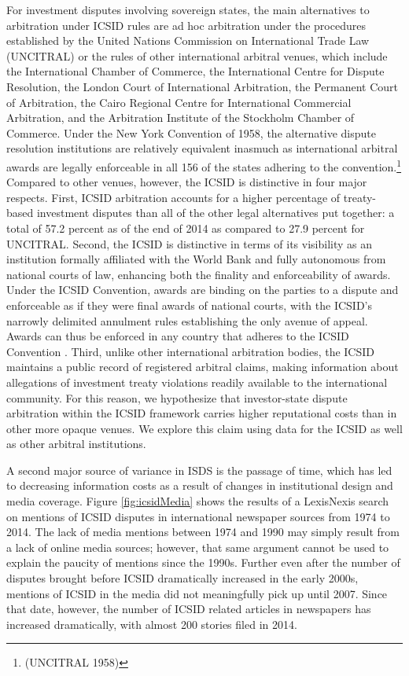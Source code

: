 \documentclass[12pt,onesided]{amsart}
\begin{document}
For investment disputes involving sovereign states, the main alternatives to arbitration under ICSID rules are ad hoc arbitration under the procedures established by the United Nations Commission on International Trade Law (UNCITRAL) or the rules of other international arbitral venues, which include the International Chamber of Commerce, the International Centre for Dispute Resolution, the London Court of International Arbitration, the Permanent Court of Arbitration, the Cairo Regional Centre for International Commercial Arbitration, and the Arbitration Institute of the Stockholm Chamber of Commerce. Under the New York Convention of 1958,  the alternative dispute resolution institutions are relatively equivalent inasmuch as international arbitral awards are legally enforceable in all 156 of the states adhering to the convention.\footnote{(UNCITRAL 1958)} Compared to other venues, however, the ICSID is distinctive in four major respects. First,  ICSID arbitration accounts for a higher percentage of treaty-based investment disputes than all of the other legal alternatives put together: a total of 57.2 percent as of the end of 2014 as compared to 27.9 percent for UNCITRAL. Second, the ICSID is distinctive in terms of its visibility as an institution formally affiliated with the World Bank and fully autonomous from national courts of law, enhancing both the finality and enforceability of awards. Under the ICSID Convention, awards are binding on the parties to a dispute and enforceable as if they were final awards of national courts, with the ICSID's narrowly delimited annulment rules establishing the only avenue of appeal. Awards can thus be enforced in any country that adheres to the ICSID Convention \citep{bernardini2010icsid}. Third, unlike other international arbitration bodies, the ICSID maintains a public record of registered arbitral claims, making information about allegations of investment treaty violations readily available to the international community. For this reason, we hypothesize that investor-state dispute arbitration within the ICSID framework carries higher reputational costs than in other more opaque venues. We explore this claim using data for the ICSID as well as other arbitral institutions.

A second major source of variance in ISDS is the passage of time, which has led to decreasing information costs as a result of changes in institutional design and media coverage. Figure \ref{fig:icsidMedia} shows the results of a LexisNexis search on mentions of ICSID disputes in international newspaper sources from 1974 to 2014. The lack of media mentions between 1974 and 1990 may simply result from a lack of online media sources; however, that same argument cannot be used to explain the paucity of mentions since the 1990s. Further even after the number of disputes brought before ICSID dramatically increased in the early 2000s, mentions of ICSID in the media did not meaningfully pick up until 2007. Since that date, however, the number of ICSID related articles in newspapers has increased dramatically, with almost 200 stories filed in 2014. 
\end{document}
